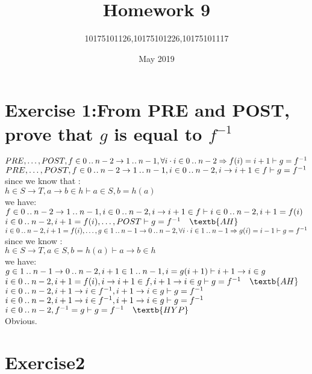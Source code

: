 \documentclass[11pt,a4paper,fleqn]{article}
\title{Homework 9}
\author{10175101126,10175101226,10175101117}
\date{May 2019}
\begin{document}
\maketitle


\section{Exercise 1:From PRE and POST, prove that $g$ is equal to  $f^{-1}$}
\noindent
$PRE,\ldots,POST ,f \in 0 \mathbin{.\mkern1mu.} n-2 \rightarrow 1 \mathbin{.\mkern1mu.} n-1, \forall i \cdot i\in 0\mathbin{.\mkern1mu.} n-2 \Rightarrow f(i)=i+1 \vdash g = f^{-1}  $\\
$PRE,\ldots,POST ,f \in 0 \mathbin{.\mkern1mu.} n-2 \rightarrow 1 \mathbin{.\mkern1mu.} n-1, i\in 0\mathbin{.\mkern1mu.} n-2 , i \rightarrow i+1 \in f \vdash g = f^{-1}  $\\
since we know that :\\
$h\in S \rightarrow T,a \rightarrow b \in h \vdash a \in S,b=h(a) $\\
we have:\\
$ f \in 0 \mathbin{.\mkern1mu.} n-2 \rightarrow 1 \mathbin{.\mkern1mu.} n-1,i\in 0\mathbin{.\mkern1mu.} n-2 , i \rightarrow i+1 \in f \vdash i \in 0\mathbin{.\mkern1mu.} n-2,i+1 = f(i) $\\
$ i\in 0\upto n-2 ,i+1 = f(i) ,\ldots,POST  \vdash g = f^{-1} \quad \textb{AH} $\\
$ i\in 0\mathbin{.\mkern1mu.} n-2 ,i+1 = f(i) ,\ldots, g \in 1 \mathbin{.\mkern1mu.} n-1 \rightarrow 0 \mathbin{.\mkern1mu.} n-2, \forall i \cdot i \in 1 \mathbin{.\mkern1mu.} n-1 \Rightarrow g(i) = i-1  \vdash g = f^{-1}  $\\
since we know :\\
$ h \in S \rightarrow T, a \in S,b = h(a) \vdash a \rightarrow b \in h $\\
we have:\\
$ g \in 1 \mathbin{.\mkern1mu.} n-1 \rightarrow 0\mathbin{.\mkern1mu.} n-2, i+1 \in 1 \mathbin{.\mkern1mu.} n-1, i = g(i+1) \vdash i+1 \rightarrow i \in g $\\
$ i\in 0\upto n-2 ,i+1 = f(i) ,i \rightarrow i+1 \in f,i+1 \rightarrow i \in g  \vdash g = f^{-1}  \quad \textb{AH}$\\
$ i\in 0\mathbin{.\mkern1mu.} n-2 ,i+1 \rightarrow i \in f^{-1},i+1 \rightarrow i \in g  \vdash g = f^{-1} $\\
$ i\in 0\mathbin{.\mkern1mu.} n-2 ,i+1 \rightarrow i \in f^{-1},i+1 \rightarrow i \in g  \vdash g = f^{-1} $\\
$ i\in 0\upto n-2 , f^{-1} = g  \vdash g = f^{-1} \quad \textb{HYP}$\\
Obvious.


\section{Exercise2 }
\end{document}
